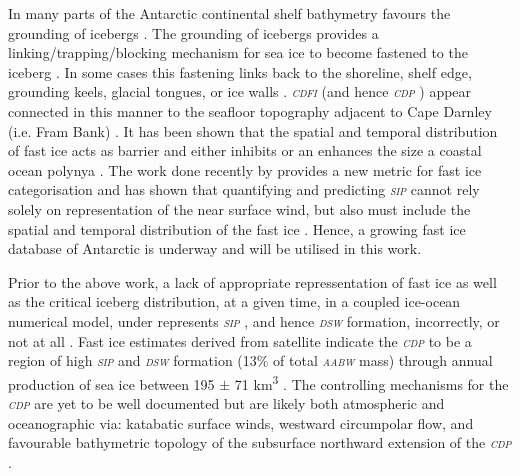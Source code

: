 \documentclass[11pt,a4paper]{article}
\newcommand{\sip}{\textit{\textsc{sip }}} %
\newcommand{\dsw}{\textit{\textsc{{dsw }}}} %
\newcommand{\aabw}{\textit{\textsc{{aabw }}}} %
\newcommand{\cdp}{\textit{\textsc{{cdp }}}} %
\newcommand{\cdfi}{\textit{\textsc{{cdfi }}}}
\newcommand{\fastice}{fast ice }
\begin{document}
In many parts of the Antarctic continental shelf bathymetry favours the grounding of
icebergs \citep{wescheIcebergSignaturesDetection2012}. The grounding of icebergs provides a linking/trapping/blocking
mechanism for sea ice to become fastened to the iceberg \citep{massomEffectsRegionalFastice2001,fraserLandfastIceControls2019,liSpatiotemporalPatternsLandfast2020}. In some cases this
fastening links back to the shoreline, shelf edge, grounding keels, glacial
tongues, or ice walls \citep{massomDistributionFormativeProcesses1998,fraserEastAntarcticLandfast2012}.
\cdfi (and hence \cdp) appear connected in this manner to the seafloor topography
adjacent to Cape Darnley (i.e. Fram Bank) \citep{nakayamaNumericalInvestigationFormation2014,liuModelingModifiedCircumpolar2017}. It has
been shown that the spatial and temporal distribution of \fastice acts as
barrier and either inhibits or an enhances the size a coastal ocean
polynya
\citep{massomEffectsRegionalFastice2001,ohshimaAntarcticBottomWater2013,nakayamaNumericalInvestigationFormation2014,nihashiCircumpolarMappingAntarctic2015,kusaharaDenseShelfWater2017,fraserLandfastIceControls2019}.
The work done recently by \cite{fraserLandfastIceControls2019} provides a new metric for
\fastice categorisation and has shown that quantifying and predicting
\sip cannot rely solely on representation of the near surface wind, but also
must include the spatial and temporal distribution of the \fastice. Hence, a
growing \fastice database of Antarctic is underway \citep{fraserHighresolutionMappingCircumAntarctic2020} and will
be utilised in this work.

Prior to the above work, a lack of appropriate repressentation of
\fastice as well as the critical iceberg distribution, at a given time, in a coupled
ice-ocean numerical model, under represents \sip, and hence \dsw formation,
incorrectly, or not at all \citep{nakayamaNumericalInvestigationFormation2014,liuModelingModifiedCircumpolar2017}. Fast\textendash  
ice estimates derived from satellite indicate the \cdp to be a region
of high \sip and \dsw formation (13\% of total \aabw mass) through annual
production of sea ice between 195 \(\pm\) 71 \si{\kilo\meter\cubed}
\citep{ohshimaAntarcticBottomWater2013,tamuraSeaIceProduction2016}. The
controlling mechanisms for the \cdp are yet to be well documented but
are likely both atmospheric and oceanographic via: katabatic surface
winds, westward circumpolar flow, and favourable bathymetric topology
of the subsurface northward extension of the \cdp. 
\end{document}
